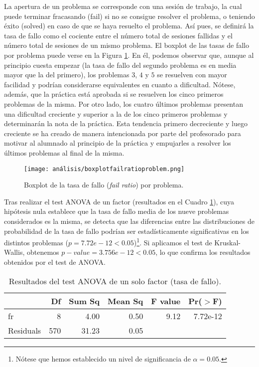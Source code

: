 La apertura de un problema se corresponde con una sesión de trabajo, la cual puede terminar fracasando (fail) si no se consigue resolver el problema, o teniendo éxito (solved) en caso de que se haya resuelto el problema. Así pues, se definirá la tasa de fallo como el cociente entre el número total de sesiones fallidas y el número total de sesiones de un mismo problema. El boxplot de las tasas de fallo por problema puede verse en la Figura \ref{fig:boxplotfailratio}. En él, podemos observar que, aunque al principio cuesta empezar (la tasa de fallo del segundo problema es en media mayor que la del primero), los problemas $3$, $4$ y $5$ se resuelven con mayor facilidad y podrían considerarse equivalentes en cuanto a dificultad. Nótese, además, que la práctica está aprobada si se resuelven los cinco primeros problemas de la misma. Por otro lado, los cuatro últimos problemas presentan una dificultad creciente y superior a la de los cinco primeros problemas y determinarán la nota de la práctica. Esta tendencia primero decreciente y luego creciente se ha creado de manera intencionada por parte del profesorado para motivar al alumnado al principio de la práctica y empujarles a resolver los últimos problemas al final de la misma.

\begin{figure}[H]
    \centering
    \texttt{[image: análisis/boxplotfailratioproblem.png]}
    \caption{Boxplot de la tasa de fallo (\emph{fail ratio}) por problema.}
    \label{fig:boxplotfailratio}
\end{figure}

Tras realizar el test ANOVA de un factor (resultados en el Cuadro \ref{tab:ANOVAfailratio}), cuya hipótesis nula establece que la tasa de fallo media de los nueve problemas considerados es la misma, se detecta que las diferencias entre las distribuciones de probabilidad de la tasa de fallo  podrían ser estadísticamente significativas en los distintos problemas ($p = 7.72e-12 < 0.05$)\footnote{Nótese que hemos establecido un nivel de significancia de $\alpha = 0.05$.}. Si aplicamos el test de Kruskal-Wallis, obtenemos $p-value = 3.756e-12 < 0.05$, lo que confirma los resultados obtenidos por el test de ANOVA.

\begin{table}[H]
\centering
\caption{Resultados del test ANOVA de un solo factor (tasa de fallo).}
\label{tab:ANOVAfailratio}
\begin{tabular}{lrrrrr}
  \hline
 & Df & Sum Sq & Mean Sq & F value & Pr($>$F) \\ 
  \hline
fr & 8 & 4.00 & 0.50 & 9.12 & 7.72e-12 \\ 
  Residuals        & 570 & 31.23 & 0.05 &  &  \\ 
   \hline
\end{tabular}
\end{table}

